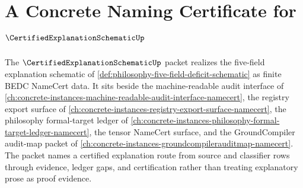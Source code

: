 \chapter{A Concrete Naming Certificate for $\CertifiedExplanationSchematicUp$}
\label{ch:concrete-instances-certified-explanation-schematic-namecert}

The $\CertifiedExplanationSchematicUp$ packet realizes the five-field explanation schematic of \autoref{def:philosophy-five-field-deficit-schematic} as finite BEDC NameCert data. It sits beside the machine-readable audit interface of \autoref{ch:concrete-instances-machine-readable-audit-interface-namecert}, the registry export surface of \autoref{ch:concrete-instances-registry-export-surface-namecert}, the philosophy formal-target ledger of \autoref{ch:concrete-instances-philosophy-formal-target-ledger-namecert}, the tensor NameCert surface, and the GroundCompiler audit-map packet of \autoref{ch:concrete-instances-groundcompilerauditmap-namecert}. The packet names a certified explanation route from source and classifier rows through evidence, ledger gaps, and certification rather than treating explanatory prose as proof evidence.



